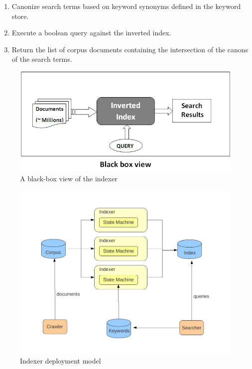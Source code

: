 \documentclass[10pt]{report}
\begin{document}
\begin{enumerate}
  \item Canonize search terms based on keyword synonyms defined in the
    keyword store.
  \item Execute a boolean query against the inverted index.
  \item Return the list of corpus documents containing the
    intersection of the canons of the search terms.
\end{enumerate}

\begin{figure}
  \begin{center}
	\includegraphics[width=\textwidth,height=!]{blackbox}
  \end{center}
  \caption{A black-box view of the indexer}
  \label{fig:blackbox}
\end{figure} 


\begin{figure}
  \begin{center}
	\includegraphics[width=\textwidth,height=!]{deploymentmodel}
  \end{center}
  \caption{Indexer deployment model}
  \label{fig:deploymentmodel}
\end{figure} 
\end{document}
